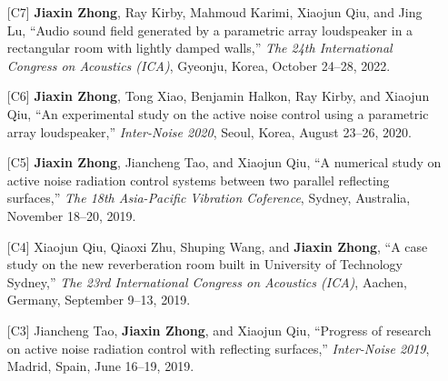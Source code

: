 \documentclass[10pt,a4paper,ragged2e,withhyper]{altacv}
\newcommand{\PubConference}[1]{\textit{#1}}
\newcommand{\PubTitle}[1]{``{#1,}''}
\newcommand{\PubMe}[1]{\textbf{#1}}
\begin{document}
\begin{itemize}[leftmargin = 25pt]
    \item[{[C7]}] 
        \PubMe{Jiaxin Zhong}, Ray Kirby, Mahmoud Karimi, Xiaojun Qiu, and Jing Lu,
        \PubTitle{Audio sound field generated by a parametric array loudspeaker in a rectangular room with lightly damped walls}
        \PubConference{The 24th International Congress on Acoustics (ICA)},
        Gyeonju, Korea, October 24--28, 2022.
        \href{https://github.com/JiaxinZhong/JiaxinZhong.github.io/raw/master/publications/conference/Zhong2022-ICA-PAL_room.pdf}{\color{accent}\faFilePdf[regular]}

    \item[{[C6]}] \PubMe{Jiaxin Zhong}, Tong Xiao, Benjamin Halkon, Ray Kirby, and Xiaojun Qiu,
        \PubTitle{An experimental study on the active noise control using a parametric array loudspeaker}
        \PubConference{Inter-Noise 2020},
        Seoul, Korea,
        August 23--26, 2020.
        \href{https://github.com/JiaxinZhong/JiaxinZhong.github.io/raw/master/publications/conference/Zhong2020-Internoise-PAL_ANC.pdf}{\color{accent}\faFilePdf[regular]}

    \item[{[C5]}] \PubMe{Jiaxin Zhong}, Jiancheng Tao, and Xiaojun Qiu,
        \PubTitle{A numerical study on active noise radiation control systems between two parallel reflecting surfaces}
        \PubConference{The 18th Asia-Pacific Vibration Coference},
        Sydney, Australia, 
        November 18--20, 2019.
        \href{https://github.com/JiaxinZhong/JiaxinZhong.github.io/raw/master/publications/conference/Zhong2019-APVC-ANC_parallel_surface.pdf}{\color{accent}\faFilePdf[regular]}

    \item[{[C4]}] Xiaojun Qiu, Qiaoxi Zhu, Shuping Wang, and \PubMe{Jiaxin Zhong},
        \PubTitle{A case study on the new reverberation room built in University of Technology Sydney}
        \PubConference{The 23rd International Congress on Acoustics (ICA)},
        Aachen, Germany, 
        September 9--13, 2019.
        \href{https://github.com/JiaxinZhong/JiaxinZhong.github.io/raw/master/publications/conference/Qiu2019-ICA-Reverberation_room_UTS.pdf}{\color{accent}\faFilePdf[regular]}

    \item[{[C3]}] Jiancheng Tao, \PubMe{Jiaxin Zhong}, and Xiaojun Qiu,
        \PubTitle{Progress of research on active noise radiation control with reflecting surfaces}
        \PubConference{Inter-Noise 2019},
        Madrid, Spain, 
        June 16--19, 2019.
        \href{https://github.com/JiaxinZhong/JiaxinZhong.github.io/raw/master/publications/conference/Tao2019-Internoise-ANC_surface.pdf}{\color{accent}\faFilePdf[regular]}


\end{itemize}
\end{document}
